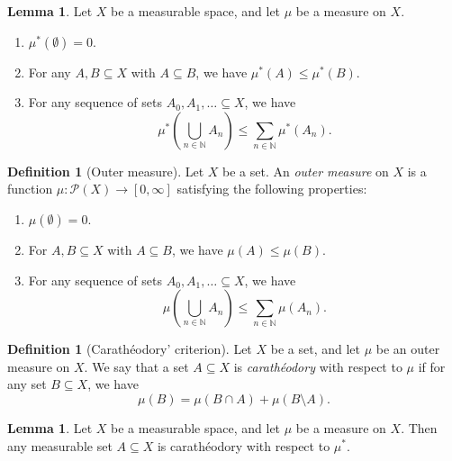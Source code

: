 \documentclass{article}
\theoremstyle{definition}
\newtheorem{lemma}[theorem]{Lemma}
\newtheorem{definition}[theorem]{Definition}
\begin{document}
\begin{lemma}
  Let $X$ be a measurable space,
  and let $\mu$ be a measure on $X$.
  \begin{enumerate}
    \item $\mu^* (\emptyset) = 0$.
    \item For any $A, B \subseteq X$ with $A \subseteq B$, we have $\mu^* (A) \leq \mu^* (B)$.
    \item For any sequence of sets $A_0, A_1, \dots \subseteq X$, we have
      \begin{equation*}
        \mu^* \left(\bigcup_{n \in \mathbb{N}} A_n\right) \leq \sum_{n \in \mathbb{N}} \mu^* (A_n).
      \end{equation*}
  \end{enumerate}
\end{lemma}

\begin{definition}[Outer measure]
  Let $X$ be a set.
  An \emph{outer measure} on $X$ is a function $\mu : \mathcal{P}(X) \to [0, \infty]$ satisfying the following properties:
  \begin{enumerate}
    \item $\mu(\emptyset) = 0$.
    \item For $A, B \subseteq X$ with $A \subseteq B$, we have $\mu(A) \leq \mu(B)$.
    \item For any sequence of sets $A_0, A_1, \dots \subseteq X$, 
      we have
      \begin{equation*}
        \mu \left(\bigcup_{n \in \mathbb{N}} A_n\right) \leq \sum_{n \in \mathbb{N}} \mu(A_n).
      \end{equation*}
  \end{enumerate}
\end{definition}

\begin{definition}[Carath\'eodory' criterion]
  Let $X$ be a set, and let $\mu$ be an outer measure on $X$.
  We say that a set $A \subseteq X$ is
  \emph{carath\'eodory} with respect to $\mu$ if
  for any set $B \subseteq X$, we have 
  \begin{equation*}
    \mu(B) = \mu(B \cap A) + \mu(B \setminus A).
  \end{equation*}
\end{definition}

\begin{lemma}
  Let $X$ be a measurable space, and let $\mu$ be a measure on $X$.
  Then any measurable set $A \subseteq X$ is carath\'eodory with respect to $\mu^*$.
\end{lemma}
\end{document}
